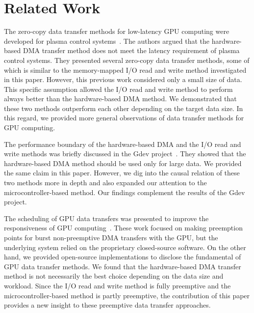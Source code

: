 \section{Related Work}
\label{sec:related_work}

The zero-copy data transfer methods for low-latency GPU computing were
developed for plasma control systems~\cite{Kato_ICCPS13}.
The authors argued that the hardware-based DMA transfer method does not
meet the latency requirement of plasma control systems.
They presented several zero-copy data transfer methods, some of which is
similar to the memory-mapped I/O read and write method investigated in
this paper.
However, this previous work considered only a small size of data.
This specific assumption allowed the I/O read and write method to
perform always better than the hardware-based DMA method.
We demonstrated that these two methods outperform each other depending
on the target data size.
In this regard, we provided more general observations of data transfer
methods for GPU computing.

The performance boundary of the hardware-based DMA and the I/O read and
write methods was briefly discussed in the Gdev
project~\cite{Kato_ATC12}. 
They showed that the hardware-based DMA method should be used only for
large data.
We provided the same claim in this paper.
However, we dig into the causal relation of these two methods more in
depth and also expanded our attention to the microcontroller-based
method.
Our findings complement the results of the Gdev project.

The scheduling of GPU data transfers was presented to improve the
responsiveness of GPU computing~\cite{Basaran_ECRTS12, Kato_RTSS11}.
These work focused on making preemption points for burst non-preemptive
DMA transfers with the GPU, but the underlying system relied on the
proprietary closed-source software.
On the other hand, we provided open-source implementations to disclose
the fundamental of GPU data transfer methods.
We found that the hardware-based DMA transfer method is not necessarily
the best choice depending on the data size and workload.
Since the I/O read and write method is fully preemptive and the
microcontroller-based method is partly preemptive, the contribution of
this paper provides a new insight to these preemptive data transfer
approaches.